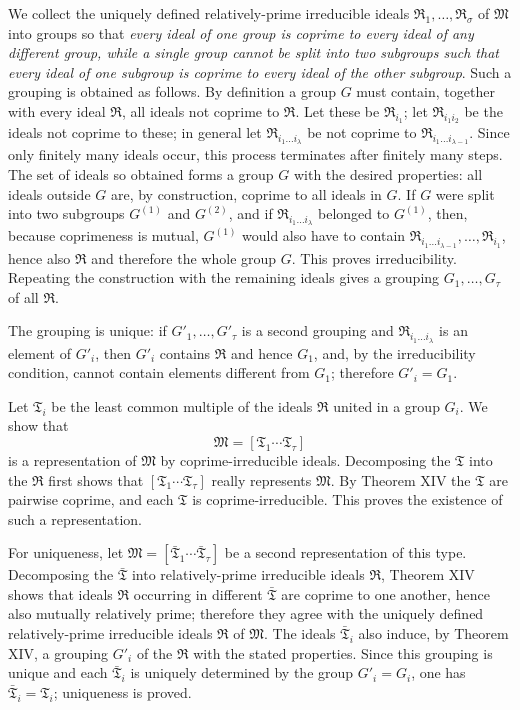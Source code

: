 \documentclass[11pt]{article}
\newcommand{\ideal}[1]{\mathfrak{#1}}
\begin{document}
We collect the uniquely defined relatively-prime irreducible ideals $\ideal R_1,
\ldots,\ideal R_\sigma$ of $\ideal M$ into groups so that \emph{every ideal of one group is coprime to every ideal of any different group, while a single group cannot be split into two subgroups such that every ideal of one subgroup is coprime to every ideal of the other subgroup}. Such a grouping is obtained as follows. By definition a group $G$ must contain, together with every ideal $\ideal R$, all ideals not coprime to $\ideal R$. Let these be $\ideal R_{i_1}$; let $\ideal R_{i_1i_2}$ be the ideals not coprime to these; in general let $\ideal R_{i_1\ldots i_\lambda}$ be not coprime to $\ideal R_{i_1\ldots i_{\lambda-1}}$. Since only finitely many ideals occur, this process terminates after finitely many steps. The set of ideals so obtained forms a group $G$ with the desired properties: all ideals outside $G$ are, by construction, coprime to all ideals in $G$. If $G$ were split into two subgroups $G^{(1)}$ and $G^{(2)}$, and if $\ideal R_{i_1\ldots i_\lambda}$ belonged to $G^{(1)}$, then, because coprimeness is mutual, $G^{(1)}$ would also have to contain $\ideal R_{i_1\ldots i_{\lambda-1}},
\ldots,\ideal R_{i_1}$, hence also $\ideal R$ and therefore the whole group $G$. This proves irreducibility. Repeating the construction with the remaining ideals gives a grouping $G_1,
\ldots,G_\tau$ of all $\ideal R$.

The grouping is unique: if $G'_1,
\ldots,G'_\tau$ is a second grouping and $\ideal R_{i_1\ldots i_\lambda}$ is an element of $G'_i$, then $G'_i$ contains $\ideal R$ and hence $G_1$, and, by the irreducibility condition, cannot contain elements different from $G_1$; therefore $G'_i=G_1$.

Let $\ideal T_i$ be the least common multiple of the ideals $\ideal R$ united in a group $G_i$. We show that
\[
 \ideal M=[\ideal T_1\cdots\ideal T_\tau]
\]
is a representation of $\ideal M$ by coprime-irreducible ideals. Decomposing the $\ideal T$ into the $\ideal R$ first shows that $[\ideal T_1\cdots\ideal T_\tau]$ really represents $\ideal M$. By Theorem XIV the $\ideal T$ are pairwise coprime, and each $\ideal T$ is coprime-irreducible. This proves the existence of such a representation.

For uniqueness, let $\ideal M=[\bar{\ideal T}_1\cdots\bar{\ideal T}_\tau]$ be a second representation of this type. Decomposing the $\bar{\ideal T}$ into relatively-prime irreducible ideals $\ideal R$, Theorem XIV shows that ideals $\ideal R$ occurring in different $\bar{\ideal T}$ are coprime to one another, hence also mutually relatively prime; therefore they agree with the uniquely defined relatively-prime irreducible ideals $\ideal R$ of $\ideal M$. The ideals $\bar{\ideal T}_i$ also induce, by Theorem XIV, a grouping $G'_i$ of the $\ideal R$ with the stated properties. Since this grouping is unique and each $\bar{\ideal T}_i$ is uniquely determined by the group $G'_i=G_i$, one has $\bar{\ideal T}_i=\ideal T_i$; uniqueness is proved.
\end{document}

